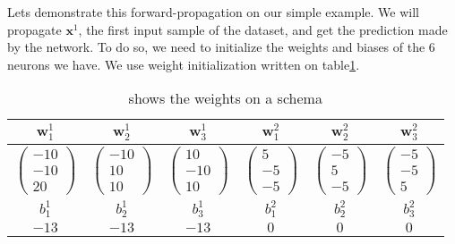 		\vskip 1cm
		Lets demonstrate this forward-propagation on our simple example. We will propagate $\boldsymbol{x}^1$, the first input sample of the dataset, and get the prediction made by the network. To do so, we need to initialize the weights and biases of the 6 neurons we have. We use weight initialization written on table\ref{tab:NN_weights}.

		\begin{table}[ht]
			\centering
			\begin{tabular}{c|c|c||c|c|c}
				$\boldsymbol{w}^1_1$ & $\boldsymbol{w}^1_2$ & $\boldsymbol{w}^1_3$ & $\boldsymbol{w}^2_1$ & $\boldsymbol{w}^2_2$ & $\boldsymbol{w}^2_3$ \\
				\hline
					$ \left( \begin{matrix} -10  \\ -10  \\  20 \end{matrix}\right) $ &
					$ \left( \begin{matrix} -10  \\  10  \\  10 \end{matrix}\right) $ &
					$ \left( \begin{matrix}  10  \\ -10  \\  10 \end{matrix}\right) $ &
					$ \left( \begin{matrix}  5   \\ -5   \\ -5  \end{matrix}\right) $ &
					$ \left( \begin{matrix} -5   \\  5   \\ -5  \end{matrix}\right) $ &
					$ \left( \begin{matrix} -5   \\ -5   \\  5  \end{matrix}\right) $ \\
				\hline
				\hline
				$b^1_1$ & $b^1_2$ & $b^1_3$ & $b^2_1$ & $b^2_2$ & $b^2_3$ \\
				$-13$   & $-13$   & $-13$   & $0$     & $0$     & $0$     \\
			\end{tabular}
			\caption{  shows the weights on a schema}
			\label{tab:NN_weights}
		\end{table}


